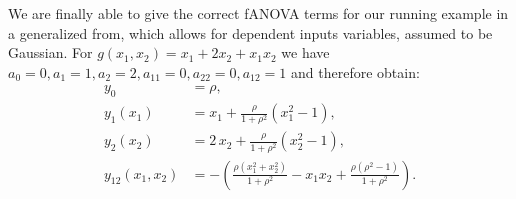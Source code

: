 We are finally able to give the correct fANOVA terms for our running example in a generalized from, which allows for dependent inputs variables, assumed to be Gaussian. For $g(x_1,x_2) = x_1 + 2x_2 + x_1 x_2$  we have $a_0 = 0, a_1 = 1, a_2 = 2, a_{11} = 0, a_{22} = 0, a_{12} = 1$ and therefore obtain:
\begin{align*}
y_0 &= \rho, \\[3pt]
y_1(x_1) &= x_1 + \frac{\rho}{1+\rho^2}(x_1^2 - 1), \\[3pt]
y_2(x_2) &= 2\,x_2 + \frac{\rho}{1+\rho^2}(x_2^2 - 1), \\[3pt]
y_{12}(x_1,x_2) 
&= -\left(\frac{\rho(x_1^2+x_2^2)}{1+\rho^2} - x_1 x_2 + \frac{\rho(\rho^2-1)}{1+\rho^2}\right).
\end{align*}





